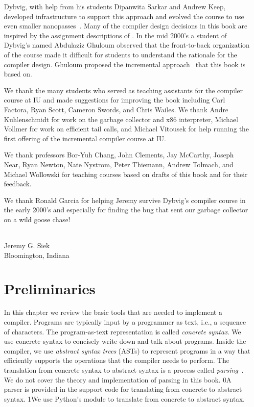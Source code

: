 \documentclass[7x10,nocrop]{TimesAPriori_MIT}%
\def\racketEd{0}
\def\pythonEd{1}
\def\edition{1}
\newcommand{\racket}[1]{{\if\edition\racketEd{#1}\fi}}
\newcommand{\python}[1]{{\if\edition\pythonEd #1\fi}}
\begin{document}
Dybvig, with help from his students Dipanwita Sarkar and Andrew Keep,
developed infrastructure to support this approach and evolved the
course to use even smaller
nanopasses~\citep{Sarkar:2004fk,Keep:2012aa}.  Many of the compiler
design decisions in this book are inspired by the assignment
descriptions of \citet{Dybvig:2010aa}. In the mid 2000's a student of
Dybvig's named Abdulaziz Ghuloum observed that the front-to-back
organization of the course made it difficult for students to
understand the rationale for the compiler design. Ghuloum proposed the
incremental approach~\citep{Ghuloum:2006bh} that this book is based
on.

We thank the many students who served as teaching assistants for the
compiler course at IU and made suggestions for improving the book
including Carl Factora, Ryan Scott, Cameron Swords, and Chris
Wailes. We thank Andre Kuhlenschmidt for work on the garbage collector
and x86 interpreter, Michael Vollmer for work on efficient tail calls,
and Michael Vitousek for help running the first offering of the
incremental compiler course at IU.

We thank professors Bor-Yuh Chang, John Clements, Jay McCarthy, Joseph
Near, Ryan Newton, Nate Nystrom, Peter Thiemann, Andrew Tolmach, and
Michael Wollowski for teaching courses based on drafts of this book
and for their feedback.

We thank Ronald Garcia for helping Jeremy survive Dybvig's compiler
course in the early 2000's and especially for finding the bug that
sent our garbage collector on a wild goose chase!

\mbox{}\\
\noindent Jeremy G. Siek \\
Bloomington, Indiana

\mainmatter

\chapter{Preliminaries}
\label{ch:trees-recur}

In this chapter we review the basic tools that are needed to implement
a compiler. Programs are typically input by a programmer as text,
i.e., a sequence of characters. The program-as-text representation is
called \emph{concrete syntax}. We use concrete syntax to concisely
write down and talk about programs. Inside the compiler, we use
\emph{abstract syntax trees} (ASTs) to represent programs in a way
that efficiently supports the operations that the compiler needs to
perform. The translation
from concrete syntax to abstract syntax is a process called
\emph{parsing}~\citep{Aho:2006wb}. We do not cover the theory and
implementation of parsing in this book.
%
\racket{A parser is provided in the support code for translating from
  concrete to abstract syntax.}
%
\python{We use Python's  module to translate from concrete
  to abstract syntax.}
\end{document}
